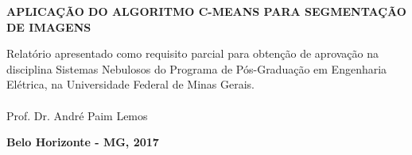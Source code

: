 \documentclass[12pt,a4paper]{article}
\numberwithin{equation}{section}
\begin{document}
\vspace{35 mm}
\begin{center}
\textbf{APLICAÇÃO DO ALGORITMO C-MEANS PARA SEGMENTAÇÃO DE IMAGENS}\\
\end{center}

\vspace{30 mm}

\vspace{35mm}
\hspace{8cm}\begin{minipage}[r]{0.45\linewidth}
Relatório apresentado como requisito parcial para obtenção de aprovação na disciplina Sistemas Nebulosos do Programa de Pós-Graduação em Engenharia Elétrica, na Universidade Federal de Minas Gerais.\\ 
\\
Prof. Dr. André Paim Lemos
\end{minipage}

\vspace{50mm}
\begin{center}
\textbf{Belo Horizonte - MG, 2017}
\end{center}

\thispagestyle{empty}
\newpage
\tableofcontents
\newpage
\listoffigures
\newpage
{}
\end{document}
